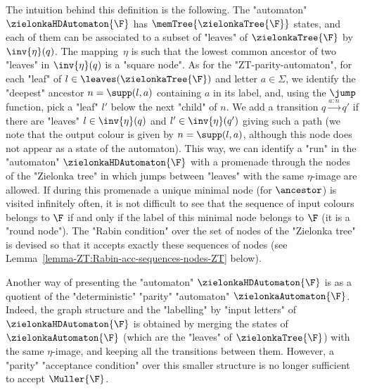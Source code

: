 \documentclass[10pt,a4paper]{amsart}
\renewcommand{\SS}{\Sigma}
\newcommand{\re}[1]{\xrightarrow{#1}}
\begin{document}
The intuition behind this definition is the following. The "automaton" $\zielonkaHDAutomaton{\F}$ has $\memTree{\zielonkaTree{\F}}$ states, and each of them can be associated to a subset of "leaves" of $\zielonkaTree{\F}$ by $\inv{\eta}(q)$. The mapping~$\eta$ is such that the lowest common ancestor of two "leaves" in  $\inv{\eta}(q)$ is a "square node".
As for the "ZT-parity-automaton", for each "leaf" of $l\in \leaves(\zielonkaTree{\F})$ and letter $a\in \SS$, we identify the "deepest" ancestor $n=\supp(l,a)$ containing $a$ in its label, and, using the $\jump$ function, pick a "leaf" $l'$ below the next "child" of $n$. We add a transition $q\re{a:n}q'$ if there are "leaves" $l\in \inv{\eta}(q)$ and $l'\in \inv{\eta}(q')$ giving such a path (we note that the output colour is given by $n=\supp(l,a)$, although this node does not appear as a state of the automaton). This way, we can identify a "run" in the "automaton" $\zielonkaHDAutomaton{\F}$ with a promenade through the nodes of the "Zielonka tree" in which jumps between "leaves" with the same $\eta$-image are allowed. If during this promenade a unique minimal node (for $\ancestor$) is visited infinitely often, it is not difficult to see that the sequence of input colours belongs to $\F$ if and only if the label of this minimal node belongs to $\F$ (it is a "round node"). The "Rabin condition" over the set of nodes of the "Zielonka tree" is devised so that it accepts exactly these sequences of nodes (see Lemma~\ref{lemma-ZT:Rabin-acc-sequences-nodes-ZT} below). 

Another way of presenting the "automaton" $\zielonkaHDAutomaton{\F}$ is as a quotient of the "deterministic" "parity" "automaton" $\zielonkaAutomaton{\F}$. Indeed, the graph structure and the "labelling" by "input letters" of $\zielonkaHDAutomaton{\F}$ is obtained by merging the states of $\zielonkaAutomaton{\F}$ (which are the "leaves" of $\zielonkaTree{\F}$) with the same $\eta$-image, and keeping all the transitions between them. However, a "parity" "acceptance condition" over this smaller structure is no longer sufficient to accept $\Muller{\F}$.
\end{document}
